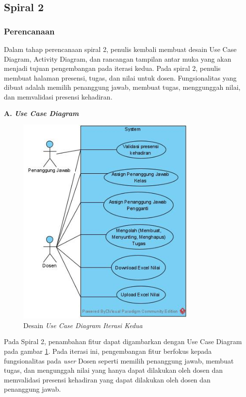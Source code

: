 \subsection{Spiral 2}		%
\subsubsection{Perencanaan}
	Dalam tahap perencanaan spiral 2, penulis kembali membuat desain Use Case Diagram, Activity Diagram, dan rancangan tampilan antar muka yang akan menjadi tujuan pengembangan pada iterasi kedua. Pada spiral 2, penulis membuat halaman presensi, tugas, dan nilai untuk dosen. Fungsionalitas yang dibuat adalah memilih penanggung jawab, membuat tugas, menggunggah nilai, dan memvalidasi presensi kehadiran.  

\textbf{A. \textit{Use Case Diagram}}

\begin{figure}[H]
	\centering
	\includegraphics[width=0.8\textwidth]{gambar/diagram/Use Case Iteration 2}
	\caption{Desain \textit{Use Case Diagram Iterasi Kedua}}
	\label{fig:usecase2nd}
\end{figure}

	Pada Spiral 2, penambahan fitur dapat digambarkan dengan Use Case Diagram pada gambar \ref{fig:usecase2nd}. Pada iterasi ini, pengembangan fitur berfokus kepada fungsionalitas pada \textit{user} Dosen seperti memilih penanggung jawab, membuat tugas, dan mengunggah nilai yang hanya dapat dilakukan oleh dosen dan memvalidasi presensi kehadiran yang dapat dilakukan oleh dosen dan penanggung jawab.



